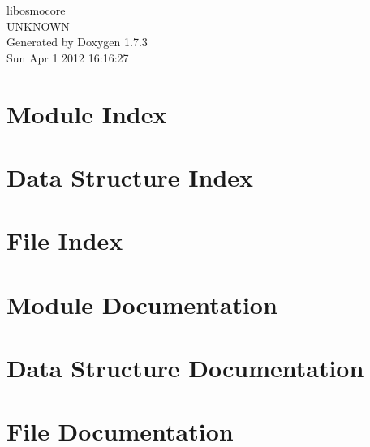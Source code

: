 \documentclass[a4paper]{book}
\begin{document}
\begin{titlepage}
\vspace*{7cm}
\begin{center}
{\Large libosmocore \\[1ex]\large UNKNOWN }\\
\vspace*{1cm}
{\large Generated by Doxygen 1.7.3}\\
\vspace*{0.5cm}
{\small Sun Apr 1 2012 16:16:27}\\
\end{center}
\end{titlepage}
\clearemptydoublepage
{}
\tableofcontents
\clearemptydoublepage
{}
\chapter{Module Index}

\chapter{Data Structure Index}

\chapter{File Index}

\chapter{Module Documentation}

\chapter{Data Structure Documentation}




\chapter{File Documentation}








\printindex
\end{document}
